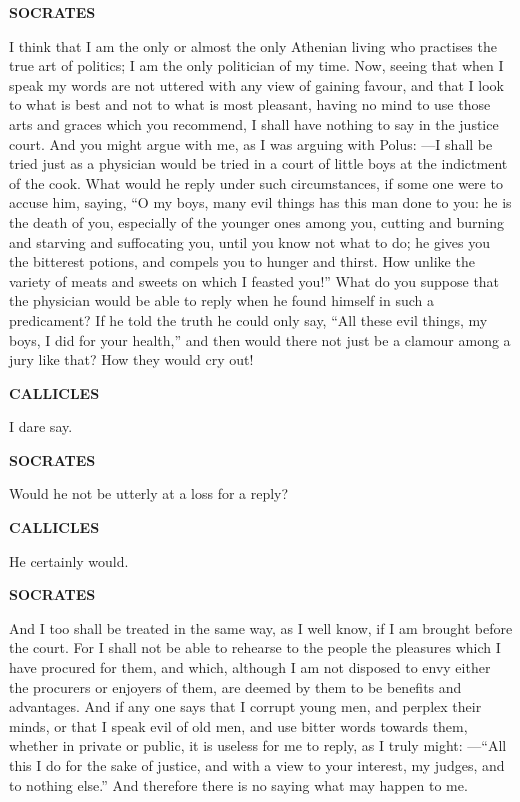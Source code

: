 \documentclass[11pt,letter]{article}
\begin{document}
\par \textbf{SOCRATES}
\par   I think that I am the only or almost the only Athenian living who practises the true art of politics; I am the only politician of my time. Now, seeing that when I speak my words are not uttered with any view of gaining favour, and that I look to what is best and not to what is most pleasant, having no mind to use those arts and graces which you recommend, I shall have nothing to say in the justice court. And you might argue with me, as I was arguing with Polus: —I shall be tried just as a physician would be tried in a court of little boys at the indictment of the cook. What would he reply under such circumstances, if some one were to accuse him, saying, “O my boys, many evil things has this man done to you:  he is the death of you, especially of the younger ones among you, cutting and burning and starving and suffocating you, until you know not what to do; he gives you the bitterest potions, and compels you to hunger and thirst. How unlike the variety of meats and sweets on which I feasted you!” What do you suppose that the physician would be able to reply when he found himself in such a predicament? If he told the truth he could only say, “All these evil things, my boys, I did for your health,” and then would there not just be a clamour among a jury like that? How they would cry out!

\par \textbf{CALLICLES}
\par   I dare say.

\par \textbf{SOCRATES}
\par   Would he not be utterly at a loss for a reply?

\par \textbf{CALLICLES}
\par   He certainly would.

\par \textbf{SOCRATES}
\par   And I too shall be treated in the same way, as I well know, if I am brought before the court. For I shall not be able to rehearse to the people the pleasures which I have procured for them, and which, although I am not disposed to envy either the procurers or enjoyers of them, are deemed by them to be benefits and advantages. And if any one says that I corrupt young men, and perplex their minds, or that I speak evil of old men, and use bitter words towards them, whether in private or public, it is useless for me to reply, as I truly might: —“All this I do for the sake of justice, and with a view to your interest, my judges, and to nothing else.” And therefore there is no saying what may happen to me.
\end{document}
